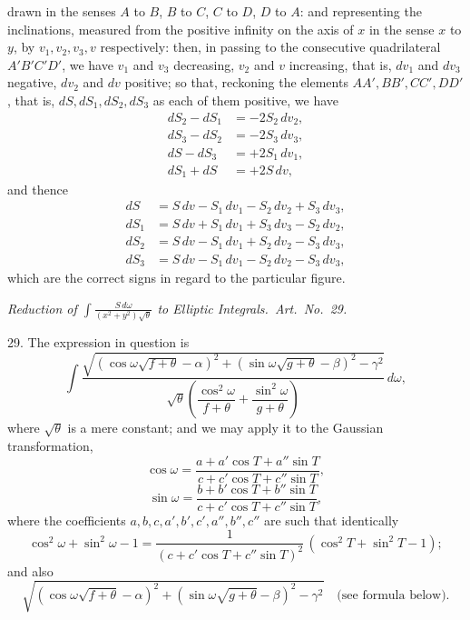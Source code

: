 \documentclass[11pt,a4paper]{article}
\begin{document}
\newpage


\noindent drawn in the senses $A$ to $B$, $B$ to $C$, $C$ to $D$, $D$ to $A$: and representing the inclinations, measured from the positive infinity on the axis of $x$ in the sense $x$ to $y$, by $v_{1}, v_{2}, v_{3}, v$ respectively: then, in passing to the consecutive quadrilateral $A'B'C'D'$, we have $v_{1}$ and $v_{3}$ decreasing, $v_{2}$ and $v$ increasing, that is, $dv_{1}$ and $dv_{3}$ negative, $dv_{2}$ and $dv$ positive; so that, reckoning the elements $AA', BB', CC', DD'$, that is, $dS, dS_{1}, dS_{2}, dS_{3}$ as each of them positive, we have
\begin{align*}
dS_{2} - dS_{1} &= -2S_{2}\,dv_{2},\\
dS_{3} - dS_{2} &= -2S_{3}\,dv_{3},\\
dS - dS_{3} &= +2S_{1}\,dv_{1},\\
dS_{1} + dS &= +2S\,dv,
\end{align*}
and thence
\begin{align*}
dS &= S\,dv - S_{1}\,dv_{1} - S_{2}\,dv_{2} + S_{3}\,dv_{3},\\
dS_{1} &= S\,dv + S_{1}\,dv_{1} + S_{3}\,dv_{3} - S_{2}\,dv_{2},\\
dS_{2} &= S\,dv - S_{1}\,dv_{1} + S_{2}\,dv_{2} - S_{3}\,dv_{3},\\
dS_{3} &= S\,dv - S_{1}\,dv_{1} - S_{2}\,dv_{2} - S_{3}\,dv_{3},
\end{align*}
which are the correct signs in regard to the particular figure.

\bigskip

\begin{center}
\emph{Reduction of $\displaystyle\int \frac{S\,d\omega}{(x^{2} + y^{2})\sqrt{\theta}}$ to Elliptic Integrals.\ Art.\ No.\ 29.}
\end{center}

\medskip

29. The expression in question is
\[
\int \frac{\sqrt{(\cos\omega\sqrt{f + \theta} - \alpha)^{2} + (\sin\omega\sqrt{g + \theta} - \beta)^{2} - \gamma^{2}}}{\sqrt{\theta}\left(\dfrac{\cos^{2}\omega}{f + \theta} + \dfrac{\sin^{2}\omega}{g + \theta}\right)}\,d\omega,
\]
where $\sqrt{\theta}$ is a mere constant; and we may apply it to the Gaussian transformation,
\[
\cos\omega = \frac{a + a'\cos T + a''\sin T}{c + c'\cos T + c''\sin T},
\]
\[
\sin\omega = \frac{b + b'\cos T + b''\sin T}{c + c'\cos T + c''\sin T},
\]
where the coefficients $a, b, c, a', b', c', a'', b'', c''$ are such that identically
\[
\cos^{2}\omega + \sin^{2}\omega - 1 = \frac{1}{(c + c'\cos T + c''\sin T)^{2}}\,(\cos^{2}T + \sin^{2}T - 1);
\]
and also
\[
\sqrt{(\cos\omega\sqrt{f + \theta} - \alpha)^{2} + (\sin\omega\sqrt{g + \theta} - \beta)^{2} - \gamma^{2}}\quad \text{(see formula below)}.
\]
\end{document}
